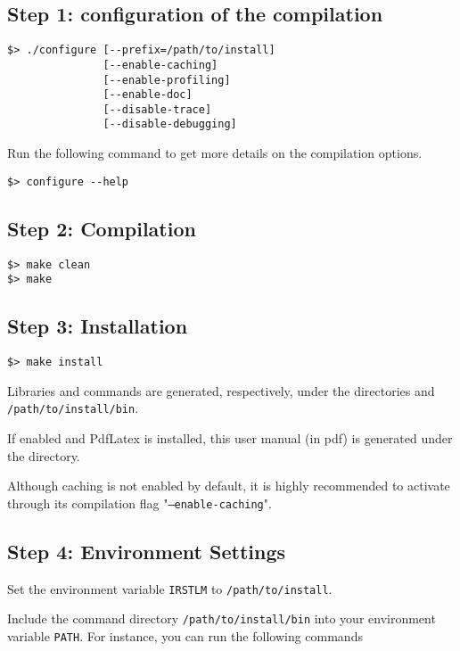 \documentclass[11pt]{article}
\begin{document}
\subsection{Step 1: configuration of the compilation}
\begin{verbatim}
$> ./configure [--prefix=/path/to/install]
               [--enable-caching] 
               [--enable-profiling]
               [--enable-doc]
               [--disable-trace]
               [--disable-debugging]
\end{verbatim}

\noindent
Run the following command to get more details on the compilation options.
\begin{verbatim}
$> configure --help
\end{verbatim}

\subsection{Step 2: Compilation}

\begin{verbatim}
$> make clean
$> make
\end{verbatim}

\subsection{Step 3: Installation}
\begin{verbatim}
$> make install
\end{verbatim}

\noindent
Libraries and commands are generated,  respectively, under the directories and {\tt /path/to/install/bin}.

\noindent
If enabled and PdfLatex is installed, this user manual (in pdf) is generated under the directory.

\noindent
Although caching is not enabled by default, it is highly recommended to activate through its compilation flag "{\tt --enable-caching}".


\subsection{Step 4: Environment Settings}
Set the environment variable {\tt IRSTLM} to {\tt /path/to/install}.

\noindent
Include the command directory {\tt /path/to/install/bin} into your environment variable {\tt PATH}.
For instance, you can run the following commands
\end{document}
